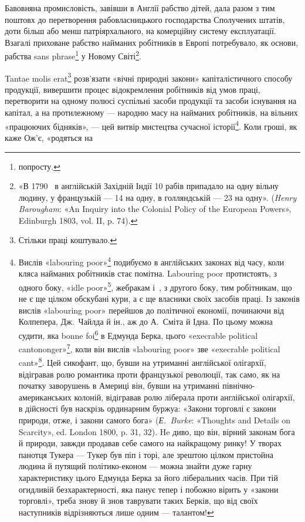 Бавовняна промисловість, завівши в Англії рабство дітей,
дала разом з тим поштовх до перетворення рабовласницького
господарства Сполучених штатів, доти більш або менш патріярхального,
на комерційну систему експлуатації. Взагалі приховане
рабство найманих робітників в Европі потребувало, як основи,
рабства sans phrase\footnote*{
попросту. 
} у Новому Світі\footnote{
«В 1790~ в англійській Західній Індії 10 рабів припадало на
одну вільну людину, у французькій — 14 на одну, в голляндській — 23
на одну». (\emph{Henry Barougham}: «An Inquiry into the Colonial Policy of
the European Powers», Edinburgh 1803, vol. II, p. 74).
}.

Tantae molis erat\footnote*{
Стільки праці коштувало. 
} розв’язати «вічні природні закони»
капіталістичного способу продукції, вивершити процес відокремлення
робітників від умов праці, перетворити на одному
полюсі суспільні засоби продукції та засоби існування на капітал,
а на протилежному — народню масу на найманих робітників,
на вільних «працюючих бідняків», — цей витвір мистецтва
сучасної історії\footnote{
Вислів «labouring poor»\footnote*{
працюючі бідняки. 
} подибуємо в англійських законах від
часу, коли кляса найманих робітників стає помітна. Labouring poor протистоять,
з одного боку, «idle poor»\footnote*{
біднякам-неробам. 
}, жебракам і~, з другого боку,
тим робітникам, що не є ще цілком обскубані кури, а є ще власники
своїх засобів праці. Із законів вислів «labouring poor» перейшов
до політичної економії, починаючи від Колпепера, Дж.~Чайлда й ін.,
аж до А.~Сміта й Ідна. По цьому можна судити, яка bonne foi\footnote*{
сумлінність. 
} в Едмунда
Берка, цього «execrable political cantononger»\footnote*{
огидливого політичного крамаря. 
}, коли він вислів
«labouring poor» зве «execrable political cant»\footnote*{
огидливим політичним перекрученням. 
}. Цей сикофант, що,
бувши на утриманні англійської олігархії, відігравав ролю романтика проти
французької революції, так само, як на початку заворушень в Америці
він, бувши на утриманні північно-американських колоній, відігравав
ролю ліберала проти англійської олігархії, в дійсності був наскрізь ординарним
буржуа: «Закони торговлі є закони природи, отже, і закони самого
бога» (\emph{Е.~Burke}: «Thoughts and Details on Scarcity», ed. London
1800, p. 31, 32). He диво, що він, вірний законам бога й природи, завжди
продавав себе самого на найкращому ринку! У творах панотця Тукера —
Тукер був піп і торі, але зрештою цілком пристойна людина й путящий
політико-економ — можна знайти дуже гарну характеристику цього
Едмунда Берка за його ліберальних часів. При тій огидливій безхарактерності,
яка панує тепер і побожно вірить у «закони торговлі», треба
знову й знов таврувати таких Берків, що від своїх наступників відрізняються
лише одним — талантом!
}. Коли гроші, як каже Ож’є, «родяться на
